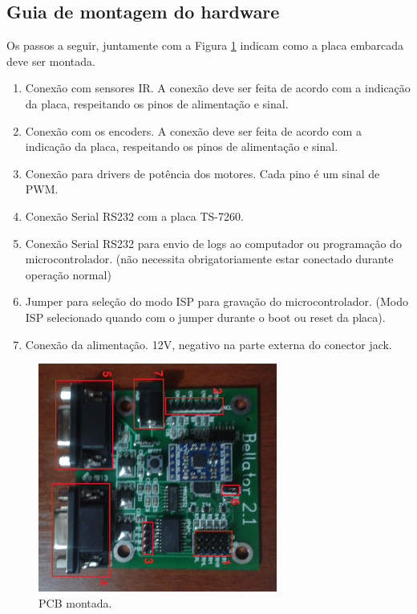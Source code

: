\subsection{Guia de montagem do hardware}

Os passos a seguir, juntamente com a Figura \ref{fig:conexoes_hardware} indicam como a placa embarcada deve ser montada.

\begin{enumerate}
\item Conexão com sensores IR. A conexão deve ser feita de acordo com a indicação da placa, respeitando os pinos de alimentação e sinal.
\item Conexão com os encoders. A conexão deve ser feita de acordo com a indicação da placa, respeitando os pinos de alimentação e sinal.
\item Conexão para drivers de potência dos motores. Cada pino é um sinal de PWM.
\item Conexão Serial RS232 com a placa TS-7260.
\item Conexão Serial RS232 para envio de logs ao computador ou programação do microcontrolador. (não necessita obrigatoriamente estar conectado durante operação normal)
\item Jumper para seleção do modo ISP para gravação do microcontrolador. (Modo ISP selecionado quando com o jumper durante o boot ou reset da placa).
\item Conexão da alimentação. 12V, negativo na parte externa do conector jack.
\end{enumerate}

\begin{figure}[H]
  \centering
  \includegraphics[width=0.7\textwidth, keepaspectratio]{./figuras/hardware/conexoes_hardware.jpg}
  \caption{PCB montada.}
  \label{fig:conexoes_hardware}
\end{figure}

